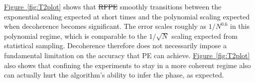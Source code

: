 \documentclass[aps,pra,amsmath,twocolumn,amssymb,superscriptaddress]{revtex4-1}
\newcommand{\fig}[1]{\hyperref[fig:#1]{Figure~\ref*{fig:#1}}}
\providecommand{\DIFaddtex}[1]{{\protect\color{blue}\uwave{#1}}} %
\providecommand{\DIFdeltex}[1]{{\protect\color{red}\sout{#1}}}                      %
\providecommand{\DIFaddbegin}{} %
\providecommand{\DIFaddend}{} %
\providecommand{\DIFdelbegin}{} %
\providecommand{\DIFdelend}{} %
\providecommand{\DIFadd}[1]{\texorpdfstring{\DIFaddtex{#1}}{#1}} %
\providecommand{\DIFdel}[1]{\texorpdfstring{\DIFdeltex{#1}}{}} %
\begin{document}

\DIFdelend \fig{T2plot} shows that \DIFdelbegin %
\DIFdel{RFPE }%
\DIFdelend \DIFaddbegin \DIFadd{RFPE }\DIFaddend smoothly transitions between the exponential scaling expected at short times and the polynomial scaling expected when decoherence becomes significant.  The error scales roughly as $1/N^{0.6}$ in this polynomial regime, which is comparable to the $1/\sqrt{N}$ scaling expected from statistical sampling.  Decoherence therefore does not necessarily impose a fundamental limitation on the accuracy that PE can achieve.  \fig{T2plot} also shows that confining the experiments to stay in a more coherent regime also can actually hurt the algorithm's ability to infer the phase, as expected.

\end{document}
